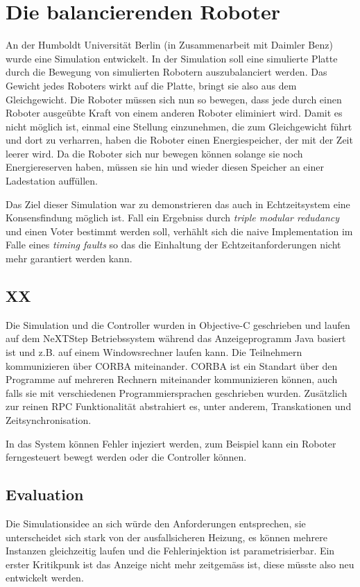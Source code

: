 \section{Die balancierenden Roboter}
An der Humboldt Universit{\"{a}}t Berlin (in Zusammenarbeit mit Daimler Benz) wurde eine Simulation\cite{Werner00} entwickelt. In der Simulation soll
eine simulierte Platte durch die Bewegung von simulierten Robotern auszubalanciert werden. Das Gewicht jedes Roboters wirkt auf die Platte, bringt sie also aus dem Gleichgewicht.
Die Roboter m{\"{u}}ssen sich nun so
bewegen, dass jede durch einen Roboter ausge{\"{u}}bte Kraft von einem anderen Roboter eliminiert wird. Damit es nicht m{\"{o}}glich ist, einmal eine Stellung einzunehmen,
die zum Gleichgewicht f{\"{u}}hrt und dort zu verharren, haben die Roboter einen Energiespeicher, der mit der Zeit leerer wird. Da die Roboter sich nur bewegen k{\"{o}}nnen
solange sie noch Energiereserven haben, m{\"{u}}ssen sie hin und wieder diesen Speicher an einer Ladestation auff{\"{u}}llen.

Das Ziel dieser Simulation war zu demonstrieren das auch in Echtzeitsystem eine Konsensfindung m{\"{o}}glich ist. Fall ein Ergebniss durch
\textit{triple modular redudancy} und einen Voter bestimmt werden soll, verh{\"{a}}hlt sich die naive Implementation im Falle eines \textit{timing faults} so das die
Einhaltung der Echtzeitanforderungen nicht mehr garantiert werden kann. 

\subsection{XX}
Die Simulation und die Controller wurden in Objective-C geschrieben und laufen auf dem NeXTStep Betriebssystem w{\"{a}}hrend das Anzeigeprogramm Java basiert ist und z.B. auf
einem Windowsrechner laufen kann. Die Teilnehmern kommunizieren {\"{u}}ber CORBA miteinander\cite{predictablecorba}. CORBA ist ein Standart {\"{u}}ber den Programme auf
mehreren Rechnern miteinander kommunizieren k{\"{o}}nnen, auch falls sie mit verschiedenen Programmiersprachen geschrieben wurden. Zus{\"{a}}tzlich zur reinen RPC
Funktionalit{\"{a}}t abstrahiert es, unter anderem, Transkationen und Zeitsynchronisation.

In das System k{\"{o}}nnen Fehler injeziert werden, zum Beispiel kann ein Roboter ferngesteuert bewegt werden oder die Controller k{\"{o}}nnen. \todo{}

\subsection{Evaluation} 
Die Simulationsidee an sich w{\"{u}}rde den Anforderungen entsprechen, sie unterscheidet sich stark von der ausfallsicheren Heizung, es k{\"{o}}nnen mehrere Instanzen
gleichzeitig laufen und die Fehlerinjektion ist parametrisierbar. Ein erster Kritikpunk ist das Anzeige nicht mehr zeitgem{\"{a}}ss ist, diese m{\"{u}}sste also neu
entwickelt werden.

